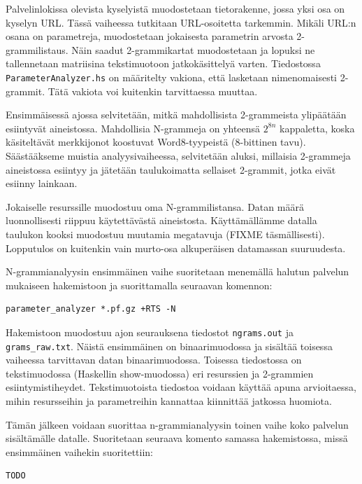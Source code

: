 Palvelinlokissa olevista kyselyistä muodostetaan tietorakenne, jossa
yksi osa on kyselyn URL. Tässä vaiheessa tutkitaan URL-osoitetta
tarkemmin. Mikäli URL:n osana on parametreja, muodostetaan jokaisesta
parametrin arvosta 2-grammilistaus. Näin saadut 2-grammikartat
muodostetaan ja lopuksi ne tallennetaan matriisina tekstimuotoon
jatkokäsittelyä varten. Tiedostossa \texttt{ParameterAnalyzer.hs} on
määritelty vakiona, että lasketaan nimenomaisesti 2-grammit. Tätä
vakiota voi kuitenkin tarvittaessa muuttaa.

Ensimmäisessä ajossa selvitetään, mitkä mahdollisista 2-grammeista
ylipäätään esiintyvät aineistossa. Mahdollisia N-grammeja on yhteensä
$2^{8n}$ kappaletta, koska käsiteltävät merkkijonot koostuvat
Word8-tyypeistä (8-bittinen tavu). Säästääkseme muistia
analyysivaiheessa, selvitetään aluksi, millaisia 2-grammeja
aineistossa esiintyy ja jätetään taulukoimatta sellaiset 2-grammit,
jotka eivät esiinny lainkaan.

Jokaiselle resurssille muodostuu oma N-grammilistansa. Datan määrä
luonnollisesti riippuu käytettävästä aineistosta. Käyttämällämme
datalla taulukon kooksi muodostuu muutamia megatavuja (FIXME täsmällisesti).
Lopputulos on kuitenkin vain murto-osa alkuperäisen datamassan
suuruudesta.

N-grammianalyysin ensimmäinen vaihe suoritetaan menemällä halutun
palvelun mukaiseen hakemistoon ja suorittamalla seuraavan komennon:

\begin{lstlisting}[language=bashshell]
parameter_analyzer *.pf.gz +RTS -N
\end{lstlisting} 

Hakemistoon muodostuu ajon seurauksena tiedostot \texttt{ngrams.out}
ja \texttt{grams\_raw.txt}. Näistä ensimmäinen on binaarimuodossa ja
sisältää toisessa vaiheessa tarvittavan datan
binaarimuodossa. Toisessa tiedostossa on tekstimuodossa (Haskellin
show-muodossa) eri resurssien ja 2-grammien
esiintymistiheydet. Tekstimuotoista tiedostoa voidaan käyttää apuna
arvioitaessa, mihin resursseihin ja parametreihin kannattaa kiinnittää
jatkossa huomiota.

Tämän jälkeen voidaan suorittaa n-grammianalyysin toinen vaihe koko
palvelun sisältämälle datalle. Suoritetaan seuraava komento samassa
hakemistossa, missä ensimmäinen vaihekin suoritettiin:

\begin{lstlisting}[language=bashshell]
TODO
\end{lstlisting} 

